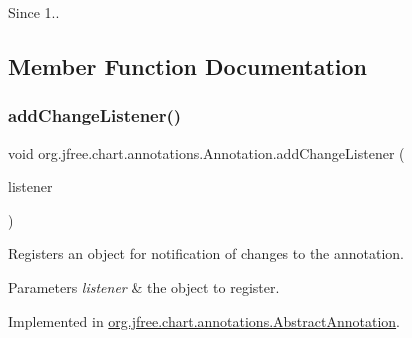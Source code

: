 \begin{DoxySince}{Since}
1.. 
\end{DoxySince}


\subsection{Member Function Documentation}
\mbox{\label{interfaceorg_1_1jfree_1_1chart_1_1annotations_1_1_annotation_aea28c7e0fd5dfce175da8303f85d449a}} 
\subsubsection{\texorpdfstring{add\+Change\+Listener()}{addChangeListener()}}
{\footnotesize\ttfamily void org.\+jfree.\+chart.\+annotations.\+Annotation.\+add\+Change\+Listener (\begin{DoxyParamCaption}\item[{\mbox{\hyperlink{interfaceorg_1_1jfree_1_1chart_1_1event_1_1_annotation_change_listener}{Annotation\+Change\+Listener}}}]{listener }\end{DoxyParamCaption})}

Registers an object for notification of changes to the annotation.


\begin{DoxyParams}{Parameters}
{\em listener} & the object to register. \\
\hline
\end{DoxyParams}


Implemented in \mbox{\hyperlink{classorg_1_1jfree_1_1chart_1_1annotations_1_1_abstract_annotation_a142d8df764f22560ce23ae44bdc9f4a6}{org.\+jfree.\+chart.\+annotations.\+Abstract\+Annotation}}.

\mbox{\label{interfaceorg_1_1jfree_1_1chart_1_1annotations_1_1_annotation_a3ecdf612567af2d1d4cb2344c47db120}} 
